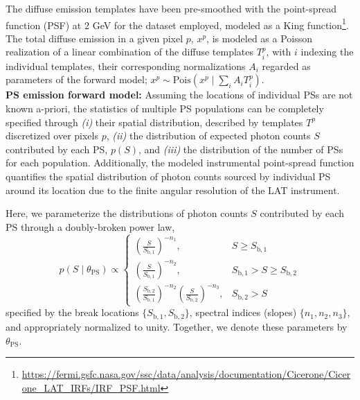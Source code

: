 \documentclass[prd,aps,10pt,nofootinbib,twocolumn,superscriptaddress,preprintnumbers,balancelastpage,longbibliography]{revtex4-1}
\begin{document}
The diffuse emission templates have been pre-smoothed with the \Fermi point-spread function (PSF) at 2 GeV for the dataset employed, modeled as a King function\footnote{\url{https://fermi.gsfc.nasa.gov/ssc/data/analysis/documentation/Cicerone/Cicerone_LAT_IRFs/IRF_PSF.html}}. The total diffuse emission in a given pixel $p$, $x^p$, is modeled as a Poisson realization of a linear combination of the diffuse templates $T^p_i$, with $i$ indexing the individual templates, their corresponding normalizations $A_i$ regarded as parameters of the forward model; $x^p \sim \mathrm{Pois}\left(x^p\mid\sum_i A_i T^p_i\right)$. \\  %

\noindent
\textbf{PS emission forward model:} Assuming the locations of individual PSs are not known a-priori, the statistics of multiple PS populations can be completely specified through \emph{(i)} their spatial distribution, described by templates $T^p$ discretized over pixels $p$, \emph{(ii)} the distribution of expected photon counts $S$ contributed by each PS, $p(S)$, and \emph{(iii)} the distribution of the number of PSs for each population.  Additionally, the modeled instrumental point-spread function quantifies the spatial distribution of photon counts sourced by individual PS around its location due to the finite angular resolution of the LAT instrument.

Here, we parameterize the distributions of photon counts $S$ contributed by each PS through a doubly-broken power law,
\begin{equation}
\label{eq:scd_bpl}
p(S\mid\theta_\mathrm{PS})\propto \left\{\begin{array}{lc}
\left(\frac{S}{S_{\mathrm b, 1}}\right)^{-n_{1}}, & S \geq S_{\mathrm b, 1} \\
\left(\frac{S}{S_{\mathrm b, 1}}\right)^{-n_{2}}, & S_{\mathrm b, 1}>S \geq S_{\mathrm b, 2} \\
\left(\frac{S_{\mathrm b, 2}}{S_{\mathrm b, 1}}\right)^{-n_{2}}\left(\frac{S}{S_{\mathrm b, 2}}\right)^{-n_{3}}, & S_{\mathrm b, 2}>S
\end{array}\right.
\end{equation}
specified by the break locations $\{S_{\mathrm b, 1}, S_{\mathrm b, 2}\}$, spectral indices (slopes) $\{n_1, n_2, n_3\}$, and appropriately normalized to unity. Together, we denote these parameters by $\theta_\mathrm{PS}$.
\end{document}
